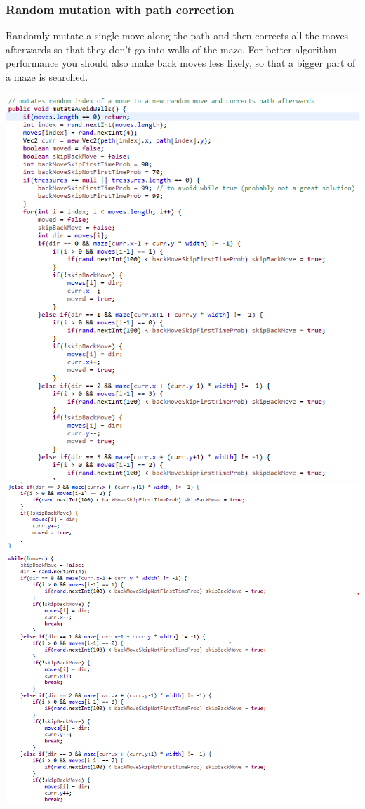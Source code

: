 \documentclass[12pt]{article} %
\begin{document}
\subsubsection{Random mutation with path correction}
Randomly mutate a single move along the path and then corrects all the moves afterwards so that they don't go into walls of the maze. For better
algorithm performance you should also make back moves less likely, so that a bigger part of a maze is searched.

\includegraphics[scale=1]{randomMovePathCorrectionMutation1}
\includegraphics[scale=1]{randomMovePathCorrectionMutation2}
\end{document}
